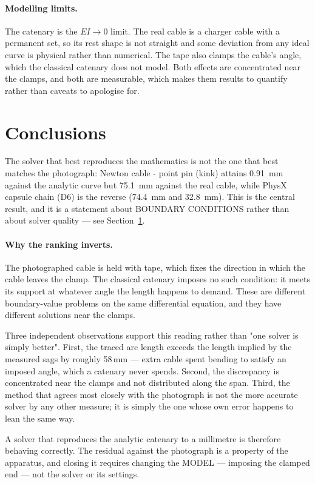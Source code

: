 \documentclass[11pt,a4paper]{article}
\begin{document}
\paragraph{Modelling limits.} The catenary is the $EI \to 0$ limit. The real
cable is a charger cable with a permanent set, so its rest shape is not
straight and some deviation from any ideal curve is physical rather than
numerical. The tape also clamps the cable's angle, which the classical
catenary does not model. Both effects are concentrated near the clamps, and
both are measurable, which makes them results to quantify rather than caveats
to apologise for.

\section{Conclusions}
\label{sec:conclusions}

The solver that best reproduces the mathematics is not the one that best matches the photograph: Newton cable - point pin (kink) attains 0.91~mm against the analytic curve but 75.1~mm against the real cable, while PhysX capsule chain (D6) is the reverse (74.4~mm and 32.8~mm). This is the central result, and it is a statement about BOUNDARY CONDITIONS rather than about solver quality --- see Section~\ref{sec:conclusions}.

\paragraph{Why the ranking inverts.} The photographed cable is held with
tape, which fixes the direction in which the cable leaves the clamp. The
classical catenary imposes no such condition: it meets its support at whatever
angle the length happens to demand. These are different boundary-value
problems on the same differential equation, and they have different solutions
near the clamps.

Three independent observations support this reading rather than "one solver is
simply better". First, the traced arc length exceeds the length implied by the
measured sags by roughly 58\,mm --- extra cable spent bending to satisfy an
imposed angle, which a catenary never spends. Second, the discrepancy is
concentrated near the clamps and not distributed along the span. Third, the
method that agrees most closely with the photograph is not the more accurate
solver by any other measure; it is simply the one whose own error happens to
lean the same way.

A solver that reproduces the analytic catenary to a millimetre is therefore
behaving correctly. The residual against the photograph is a property of the
apparatus, and closing it requires changing the MODEL --- imposing the clamped
end --- not the solver or its settings.
\end{document}
